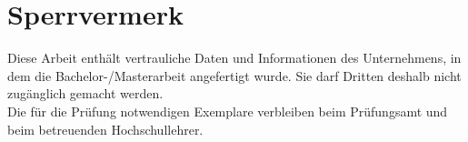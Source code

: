 

\newpage
\section*{Sperrvermerk}
\thispagestyle{empty}
Diese Arbeit enthält vertrauliche Daten und Informationen des Unternehmens, in dem die Bachelor-/Masterarbeit angefertigt wurde.
Sie darf Dritten deshalb nicht zugänglich gemacht werden. \\
Die für die Prüfung notwendigen Exemplare verbleiben beim Prüfungsamt und beim betreuenden Hochschullehrer.
\newpage

